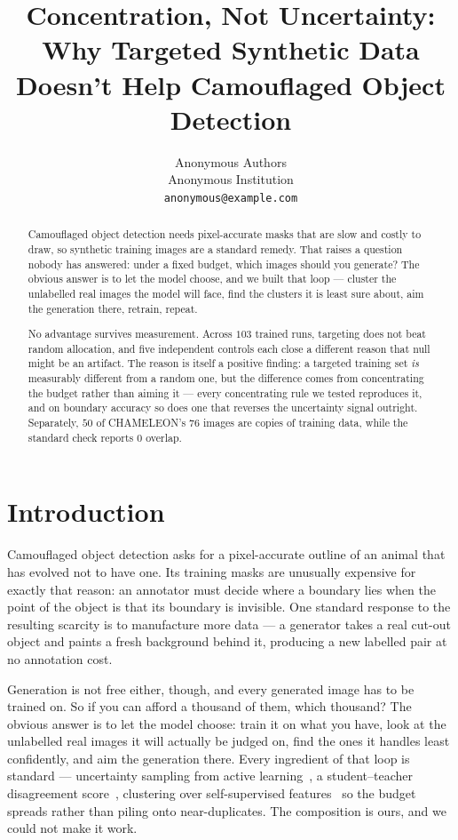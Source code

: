 \documentclass{article}
\title{Concentration, Not Uncertainty: Why Targeted Synthetic Data Doesn't Help Camouflaged Object Detection}
\author{Anonymous Authors \\
Anonymous Institution \\
\texttt{anonymous@example.com}
}
\begin{document}
\maketitle

\begin{abstract}
Camouflaged object detection needs pixel-accurate masks that are slow and costly to draw, so
synthetic training images are a standard remedy. That raises a question nobody has answered: under a
fixed budget, which images should you generate? The obvious answer is to let the model choose, and
we built that loop --- cluster the unlabelled real images the model will face, find the clusters it
is least sure about, aim the generation there, retrain, repeat.

No advantage survives measurement. Across $103$ trained runs, targeting does not beat random
allocation, and five independent controls each close a different reason that null might be an
artifact. The reason is itself a positive finding: a targeted training set
\emph{is} measurably different from a random one, but the difference comes from concentrating the
budget rather than aiming it --- every concentrating rule we tested reproduces it, and on boundary
accuracy so does one that reverses the uncertainty signal outright. Separately, $50$ of
CHAMELEON's $76$ images are copies of training data, while the standard check reports $0$ overlap.
\end{abstract}

\section{Introduction}
\label{sec:intro}
Camouflaged object detection asks for a pixel-accurate outline of an animal that has evolved not to
have one. Its training masks are unusually expensive for exactly that reason: an annotator must
decide where a boundary lies when the point of the object is that its boundary is invisible. One
standard response to the resulting scarcity is to manufacture more data --- a generator takes a real
cut-out object and paints a fresh background behind it, producing a new labelled pair at no
annotation cost.

Generation is not free either, though, and every generated image has to be trained on. So if you can
afford a thousand of them, which thousand? The obvious answer is to let the model choose: train it
on what you have, look at the unlabelled real images it will actually be judged on, find the ones it
handles least confidently, and aim the generation there. Every ingredient of that loop is
standard --- uncertainty sampling from active learning~\citep{settles2009active}, a student--teacher
disagreement score~\citep{tarvainen2017mean}, clustering over self-supervised
features~\citep{oquab2024dinov2} so the budget spreads rather than piling onto near-duplicates. The
composition is ours, and we could not make it work.
\end{document}
